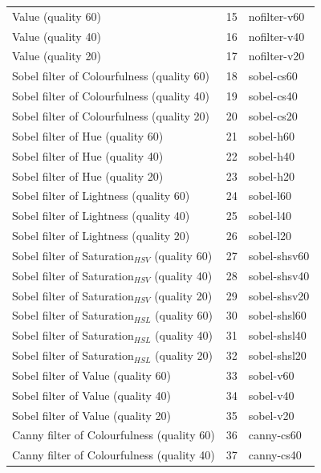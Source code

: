 \documentclass[11pt,a4paper,twoside,openright]{report}
\begin{document}
\begin{center}
\begin{longtable}{|l|c|l|}
Value (quality 60)                              & 15 & nofilter-v60    \\
Value (quality 40)                              & 16 & nofilter-v40    \\
Value (quality 20)                              & 17 & nofilter-v20    \\
Sobel filter of Colourfulness (quality 60)      & 18 & sobel-cs60      \\
Sobel filter of Colourfulness (quality 40)      & 19 & sobel-cs40      \\
Sobel filter of Colourfulness (quality 20)      & 20 & sobel-cs20      \\
Sobel filter of Hue (quality 60)                & 21 & sobel-h60       \\
Sobel filter of Hue (quality 40)                & 22 & sobel-h40       \\
Sobel filter of Hue (quality 20)                & 23 & sobel-h20       \\
Sobel filter of Lightness (quality 60)          & 24 & sobel-l60       \\
Sobel filter of Lightness (quality 40)          & 25 & sobel-l40       \\
Sobel filter of Lightness (quality 20)          & 26 & sobel-l20       \\
Sobel filter of Saturation$_{HSV}$ (quality 60) & 27 & sobel-shsv60    \\
Sobel filter of Saturation$_{HSV}$ (quality 40) & 28 & sobel-shsv40    \\
Sobel filter of Saturation$_{HSV}$ (quality 20) & 29 & sobel-shsv20    \\
Sobel filter of Saturation$_{HSL}$ (quality 60) & 30 & sobel-shsl60    \\
Sobel filter of Saturation$_{HSL}$ (quality 40) & 31 & sobel-shsl40    \\
Sobel filter of Saturation$_{HSL}$ (quality 20) & 32 & sobel-shsl20    \\
Sobel filter of Value (quality 60)              & 33 & sobel-v60       \\
Sobel filter of Value (quality 40)              & 34 & sobel-v40       \\
Sobel filter of Value (quality 20)              & 35 & sobel-v20       \\
Canny filter of Colourfulness (quality 60)      & 36 & canny-cs60      \\
Canny filter of Colourfulness (quality 40)      & 37 & canny-cs40      \\

\end{longtable}
\end{center}
\end{document}
